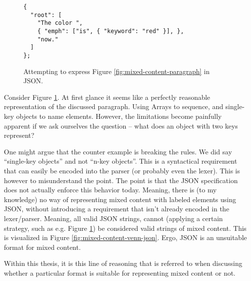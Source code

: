 \documentclass{scrreprt}
\begin{document}
\begin{figure}[h]
\begin{lstlisting}
{
  "root": [
    "The color ",
    { "emph": ["is", { "keyword": "red" }], },
    "now."
  ]
};
\end{lstlisting}
\caption{Attempting to express Figure \ref{fig:mixed-content-paragraph} in JSON.}
\label{fig:mixed-content-json}
\end{figure}


Consider Figure \ref{fig:mixed-content-json}. At first glance it seems like a perfectly reasonable representation of the discussed paragraph. Using Arrays to sequence, and single-key objects to name elements. However, the limitations become painfully apparent if we ask ourselves the question -- what does an object with two keys represent?

One might argue that the counter example is breaking the rules. We did say ``single-key objects'' and not ``n-key objects''. This is a syntactical requirement that can easily be encoded into the parser (or probably even the lexer). This is however to misunderstand the point. The point is that the JSON specification does not actually enforce this behavior today. Meaning, there is (to my knowledge) no way of representing mixed content with labeled elements using JSON, without introducing a requirement that isn't already encoded in the lexer/parser. Meaning, all valid JSON strings, cannot (applying a certain strategy, such as e.g. Figure \ref{fig:mixed-content-json}) be considered valid strings of mixed content. This is visualized in Figure \ref{fig:mixed-content-venn-json}. Ergo, JSON is an unsuitable format for mixed content.

Within this thesis, it is this line of reasoning that is referred to when discussing whether a particular format is suitable for representing mixed content or not.
\end{document}
